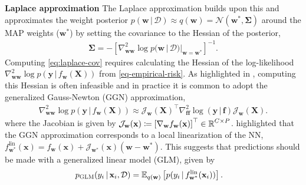 \documentclass{article}
\newcommand{\weights}{\ensuremath{\mathbf{w}}}
\newcommand{\mbf}[1]{\mathbf{#1}}
\renewcommand{\mid}{\,|\,}
\newcommand{\MX}{\mbf{X}}
\newcommand{\vf}{\mbf{f}}
\newcommand{\vx}{\mbf{x}}
\newcommand{\vy}{\mbf{y}}
\newcommand{\vw}{\mbf{w}}
\newcommand{\Jac}[2]{\mathcal{J}_{#1}(#2)}
\begin{document}
\textbf{Laplace approximation}
The Laplace approximation \citet{mackayBayesian1992,daxberger2021laplace} builds upon this and approximates the weight posterior $p(\vw \mid \mathcal{D}) \approx q(\vw)= \mathcal{N}(\vw^{*} , \bm\Sigma)$
around the MAP weights ($\vw^{*}$) by setting the covariance to the Hessian of the posterior,
\begin{align} \label{eq:laplace-cov}
 \bm\Sigma = - \left[\nabla^{2}_{\vw\vw} \log p(\vw \mid \mathcal{D})  |_{\vw=\vw^{*}} \right]^{-1}.
\end{align}
Computing \cref{eq:laplace-cov} requires calculating the Hessian of the log-likelihood $\nabla^{2}_{\vw\vw} \log p(\vy \mid f_{\vw}(\MX))$ from \cref{eq-empirical-risk}.
As highlighted in \citet{immer2021improving}, computing this Hessian is often infeasible and in practice it is common to adopt the
generalized Gauss-Newton (GGN) approximation,
\begin{align}
 \nabla^{2}_{\vw\vw} \log p(\vy \mid f_{\vw}(\MX)) \approx \Jac{\vw}{\MX}^{\top} \nabla_{\vf\vf}^{2}\log(\vy\mid\vf) \Jac{\vw}{\MX}.
  \nonumber
\end{align}
where the Jacobian is given by $\Jac{\weights}{\vx} \coloneqq \left[ \nabla_\weights f_\weights(\vx)\right]^\top \in \R^{C \times P}$.
\citet{immer2021improving} highlighted that the GGN approximation corresponds to a local linearization of the NN,
$f_{\weights^{*}}^{\text{lin}}(\vx) = f_{\weights}(\vx) + \Jac{\weights^{*}}{\vx}(\weights-\weights^{*})$.
This suggests that predictions should be made with a generalized linear model (GLM), given by
\begin{align} \label{eq-glm}
  p_{\text{\sc GLM}}(y_{i} \mid \vx_{i}, \mathcal{D}) &= \E_{q(\vw)} \left[ p(y_{i} \mid f_{\vw^{*}}^{\text{lin}}(\vx_{i}))\right]. %
\end{align}
\end{document}
